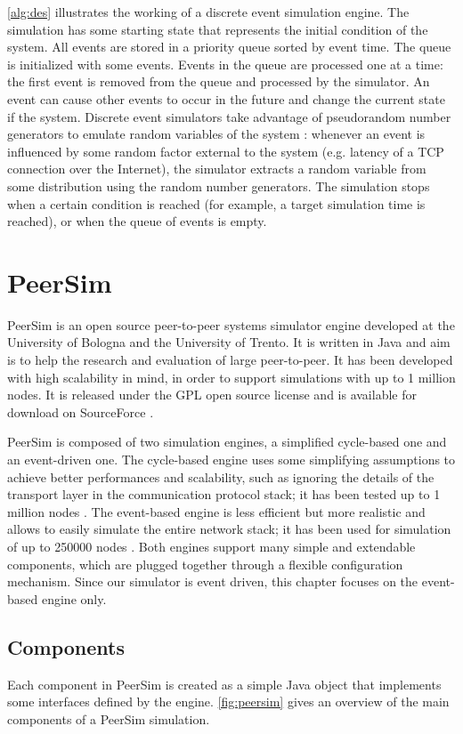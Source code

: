 \cref{alg:des} illustrates the working of a discrete event simulation engine.
The simulation has some starting state that represents the initial condition of the system.
All events are stored in a priority queue sorted by event time.
The queue is initialized with some events.
Events in the queue are processed one at a time:
the first event is removed from the queue and processed by the simulator.
An event can cause other events to occur in the future and change the current state if the system.
Discrete event simulators take advantage of pseudorandom number generators to emulate random variables of the system \cite{wikipedia_des}:
whenever an event is influenced by some random factor external to the system (e.g. latency of a TCP connection over the Internet), the simulator extracts a random variable from some distribution using the random number generators.
The simulation stops when a certain condition is reached (for example, a target simulation time is reached), or when the queue of events is empty.


\section{PeerSim}
PeerSim \cite{peersim_2009} is an open source peer-to-peer systems simulator engine developed at the University of Bologna and the University of Trento.
It is written in Java and aim is to help the research and evaluation of large peer-to-peer.
It has been developed with high scalability in mind, in order to support simulations with up to \num{1} million nodes.
It is released under the GPL open source license and is available for download on SourceForce \cite{peersim_site}.

\medskip
PeerSim is composed of two simulation engines, a simplified cycle-based one and an event-driven one.
The cycle-based engine uses some simplifying assumptions to achieve better performances and scalability, such as ignoring the details of the transport layer in the communication protocol stack;
it has been tested up to \num{1} million nodes \cite{peersim_intro_2018}.
The event-based engine is less efficient but more realistic and allows to easily simulate the entire network stack;
it has been used for simulation of up to \num{250000} nodes \cite{peersim_intro_2018}.
Both engines support many simple and extendable components, which are plugged together through a flexible configuration mechanism.
Since our simulator is event driven, this chapter focuses on the event-based engine only.

\subsection{Components}
Each component in PeerSim is created as a simple Java object that implements some interfaces defined by the engine.
\cref{fig:peersim} gives an overview of the main components of a PeerSim simulation.


